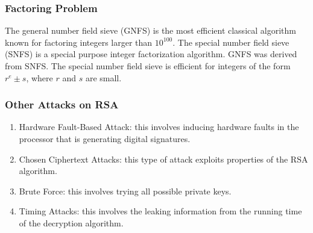 \documentclass{math}
\begin{document}
\subsubsection*{Factoring Problem}
The general number field sieve (GNFS) is the most efficient classical algorithm
known for factoring integers larger than \( 10^{100} \). The special number
field sieve (SNFS) is a special purpose integer factorization algorithm. GNFS
was derived from SNFS. The special number field sieve is efficient for integers
of the form \( r^e\pm s \), where \( r \) and \( s \) are small.

\subsubsection*{Other Attacks on RSA}
\begin{enumerate}
  \item Hardware Fault-Based Attack: this involves inducing hardware faults in
  the processor that is generating digital signatures.
  \item Chosen Ciphertext Attacks: this type of attack exploits properties of
  the RSA algorithm.
  \item Brute Force: this involves trying all possible private keys.
  \item Timing Attacks: this involves the leaking information from the running
  time of the decryption algorithm.
\end{enumerate}
\end{document}
